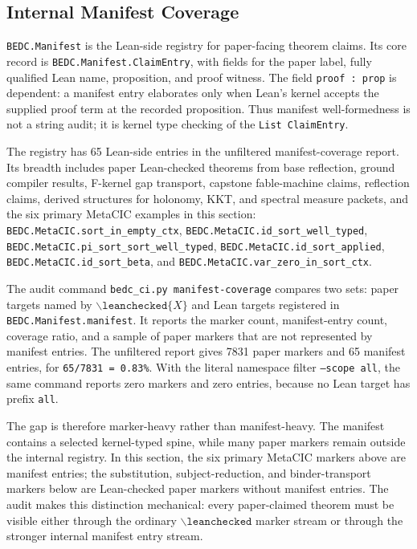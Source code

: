 \subsection{Internal Manifest Coverage}\label{subsec:internal-manifest-coverage}

\texttt{BEDC.Manifest} is the Lean-side registry for paper-facing theorem
claims. Its core record is \texttt{BEDC.Manifest.ClaimEntry}, with fields for
the paper label, fully qualified Lean name, proposition, and proof witness.
The field \texttt{proof : prop} is dependent: a manifest entry elaborates only
when Lean's kernel accepts the supplied proof term at the recorded proposition.
Thus manifest well-formedness is not a string audit; it is kernel type
checking of the \texttt{List ClaimEntry}.

The registry has 65 Lean-side entries in the unfiltered manifest-coverage
report. Its breadth includes paper Lean-checked theorems from base reflection,
ground compiler results, F-kernel gap transport, capstone fable-machine
claims, reflection claims, derived structures for holonomy, KKT, and spectral
measure packets, and the six primary MetaCIC examples in this section:
\texttt{BEDC.MetaCIC.sort\_in\_empty\_ctx},
\texttt{BEDC.MetaCIC.id\_sort\_well\_typed},
\texttt{BEDC.MetaCIC.pi\_sort\_sort\_well\_typed},
\texttt{BEDC.MetaCIC.id\_sort\_applied},
\texttt{BEDC.MetaCIC.id\_sort\_beta}, and
\texttt{BEDC.MetaCIC.var\_zero\_in\_sort\_ctx}.

The audit command \texttt{bedc\_ci.py manifest-coverage} compares two
sets: paper targets named by $\backslash\mathtt{leanchecked}\{X\}$ and Lean
targets registered in \texttt{BEDC.Manifest.manifest}. It reports the marker
count, manifest-entry count, coverage ratio, and a sample of paper markers
that are not represented by manifest entries. The unfiltered report gives
7831 paper markers and 65 manifest entries, for
\texttt{65/7831 = 0.83\%}. With the literal namespace filter
\texttt{--scope all}, the same command reports zero markers and zero entries,
because no Lean target has prefix \texttt{all}.

The gap is therefore marker-heavy rather than manifest-heavy. The manifest
contains a selected kernel-typed spine, while many paper markers remain outside
the internal registry. In this section, the six primary MetaCIC markers above
are manifest entries; the substitution, subject-reduction, and binder-transport
markers below are Lean-checked paper markers without manifest entries. The
audit makes this distinction mechanical: every paper-claimed theorem must be
visible either through the ordinary $\backslash\mathtt{leanchecked}$ marker
stream or through the stronger internal manifest entry stream.
